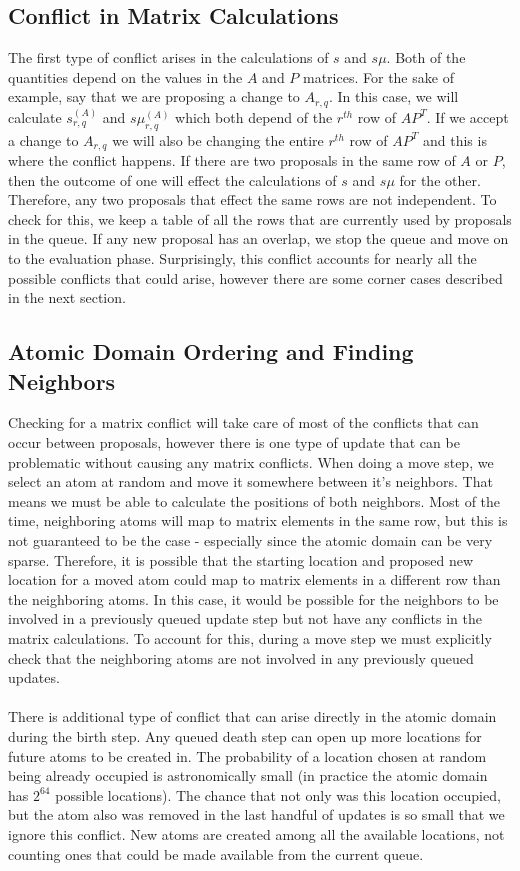 \documentclass[]{article}
\begin{document}
\subsection{Conflict in Matrix Calculations}

The first type of conflict arises in the calculations of $s$ and $s\mu$. Both of the quantities depend on the values in the $A$ and $P$ matrices. For the sake of example, say that we are proposing a change to $A_{r,q}$. In this case, we will calculate $s^{(A)}_{r,q}$ and $s\mu^{(A)}_{r,q}$ which both depend of the $r^{th}$ row of $AP^T$. If we accept a change to $A_{r,q}$ we will also be changing the entire $r^{th}$ row of $AP^T$ and this is where the conflict happens. If there are two proposals in the same row of $A$ or $P$, then the outcome of one will effect the calculations of $s$ and $s\mu$ for the other. Therefore, any two proposals that effect the same rows are not independent. To check for this, we keep a table of all the rows that are currently used by proposals in the queue. If any new proposal has an overlap, we stop the queue and move on to the evaluation phase. Surprisingly, this conflict accounts for nearly all the possible conflicts that could arise, however there are some corner cases described in the next section.

\subsection{Atomic Domain Ordering and Finding Neighbors}

Checking for a matrix conflict will take care of most of the conflicts that can occur between proposals, however there is one type of update that can be problematic without causing any matrix conflicts. When doing a move step, we select an atom at random and move it somewhere between it's neighbors. That means we must be able to calculate the positions of both neighbors. Most of the time, neighboring atoms will map to matrix elements in the same row, but this is not guaranteed to be the case - especially since the atomic domain can be very sparse. Therefore, it is possible that the starting location and proposed new location for a moved atom could map to matrix elements in a different row than the neighboring atoms. In this case, it would be possible for the neighbors to be involved in a previously queued update step but not have any conflicts in the matrix calculations. To account for this, during a move step we must explicitly check that the neighboring atoms are not involved in any previously queued updates.\\
\\
There is additional type of conflict that can arise directly in the atomic domain during the birth step. Any queued death step can open up more locations for future atoms to be created in. The probability of a location chosen at random being already occupied is astronomically small (in practice the atomic domain has $2^{64}$ possible locations). The chance that not only was this location occupied, but the atom also was removed in the last handful of updates is so small that we ignore this conflict. New atoms are created among all the available locations, not counting ones that could be made available from the current queue.
\end{document}

